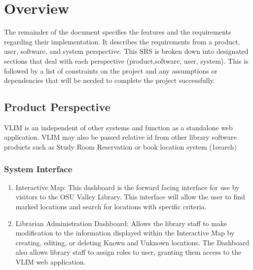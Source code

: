 \documentclass[letterpaper,10pt,titlepage, onecolumn, compsoc]{IEEEtran}
\begin{document}

\section{Overview}
The remainder of the document specifies the features and the requirements regarding their implementation. It describes the requirements from a product, user, software, and system perspective. This SRS is broken down into designated sections that deal with each perspective (product,software, user, system). This is followed by a list of constraints on the project and any assumptions or dependencies that will be needed to complete the project successfully.

\subsection{Product Perspective}
VLIM is an independent of other systems and function as a standalone web application. VLIM may also be passed relative id from other library software products such as Study Room Reservation or book location system (1search)

\subsubsection{System Interface}
\begin{enumerate}
	\item Interactive Map: This dashboard is the forward facing interface for use by visitors to the OSU Valley Library. This interface will allow the user to find marked locations and search for locations with specific criteria.
	\item Librarian Administration Dashboard: Allows the library staff to make modification to the information displayed within the Interactive Map by creating, editing, or deleting Known and Unknown locations. The Dashboard also allows library staff to assign roles to user, granting them access to the VLIM web application. 
\end{enumerate}

\end{document}
